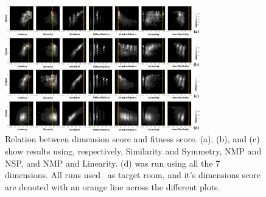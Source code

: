 \begin{figure}[h]
\centerline{\includegraphics[width=8.5cm]{figures/figure6.png}}
\caption{Relation between dimension score and fitness score. (a), (b), and (c) show results using, respectively, Similarity and Symmetry, NMP and NSP, and NMP and Linearity. (d) was run using all the 7 dimensions. All runs used~ as target room, and it's dimensions score are denoted with an orange line across the different plots.}
\label{figs:dimensions-related-fitness}
\end{figure}



% 

